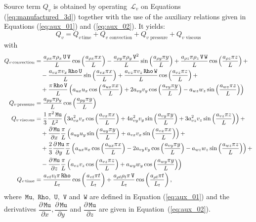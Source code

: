 \documentclass[10pt]{article}
\newcommand{\diff}[2] {\dfrac{\partial #1}{\partial #2}}
\newcommand{\Rho}{\,\mathtt{Rho}}
\newcommand{\U}{\,\mathtt{U}}
\newcommand{\V}{\,\mathtt{V}}
\newcommand{\W}{\,\mathtt{W}}
\newcommand{\Lo}{\,\mathcal{L}}
\newcommand{\Mu}{\,\mathtt{Mu}}
\newcommand{\DMuDx}{\diff{\Mu}{x}}
\newcommand{\DMuDy}{\diff{\Mu}{y}}
\newcommand{\DMuDz}{\diff{\Mu}{z}}
\newcommand{\timee}{\,\text{time}}
\newcommand{\convection}{\,\text{convection}}
\newcommand{\viscous}{\,\text{viscous}}
\newcommand{\pressure}{\,\text{pressure}}
\begin{document}
Source term $Q_v$ is obtained by operating $\Lo_{v}$ on Equations  (\ref{eq:manufactured_3d}) together with the use of the  auxiliary relations given in Equations (\ref{eq:aux_01}) and (\ref{eq:aux_02}). It yields:
\begin{equation*}
 Q_v = Q_{v \, \text{time}}+Q_{v \, \convection}+Q_{v \, \pressure }+Q_{v \, \viscous }
\end{equation*}
with
\begin{equation*}
\begin{split}
 Q_{v \convection} &= \dfrac{a_{\rho x} \pi \rho_x \U \V }{L}\cos\left(\dfrac{a_{\rho x} \pi x}{L}\right)
-\dfrac{a_{\rho y} \pi \rho_y \V^2 }{L}\sin\left(\dfrac{a_{\rho y} \pi y}{L}\right) 
+\dfrac{a_{\rho z} \pi \rho_z \V \W }{L}\cos\left(\dfrac{a_{\rho z} \pi z}{L}\right) + \\ 
  &\quad-\dfrac{a_{vx} \pi v_x \Rho \U }{L}\sin\left(\dfrac{a_{vx} \pi x}{L}\right)
  +\dfrac{a_{vz} \pi v_z \Rho \W }{L}\cos\left(\dfrac{a_{vz} \pi z}{L}\right) + \\ 
  &\quad+  \dfrac{\pi \Rho \V}{L} \left(a_{ux} u_x \cos\left(\dfrac{a_{ux} \pi x}{L}\right)+2 a_{vy} v_y \cos\left(\dfrac{a_{vy} \pi y}{L}\right)-a_{wz} w_z \sin\left(\dfrac{a_{wz} \pi z}{L}\right)\right) \\ \vspace{15pt}
%
Q_{v \pressure} &= \dfrac{a_{py} \pi p_y }{L}\cos\left(\dfrac{a_{py} \pi y}{L}\right) \\ \vspace{15pt}
%
Q_{v \viscous} &= \dfrac{1}{3} \dfrac{\pi^2 \Mu}{L^2}\left(3 a_{vx}^2 v_x \cos\left(\dfrac{a_{vx} \pi x}{L}\right)+4 a_{vy}^2 v_y \sin\left(\dfrac{a_{vy} \pi y}{L}\right)+3 a_{vz}^2 v_z \sin\left(\dfrac{a_{vz} \pi z}{L}\right)\right) + \\ 
&\quad+ \DMuDx \dfrac{\pi}{L} \left(a_{uy} u_y \sin\left(\dfrac{a_{uy} \pi y}{L}\right)+a_{vx} v_x \sin\left(\dfrac{a_{vx} \pi x}{L}\right)\right) + \\ 
&\quad+\dfrac{2}{3} \DMuDy \dfrac{\pi}{L}\left(a_{ux} u_x \cos\left(\dfrac{a_{ux} \pi x}{L}\right)-2 a_{vy} v_y \cos\left(\dfrac{a_{vy} \pi y}{L}\right)-a_{wz} w_z \sin\left(\dfrac{a_{wz} \pi z}{L}\right)\right)  + \\ 
&\quad-\DMuDz \dfrac{\pi}{L} \left(a_{vz} v_z \cos\left(\dfrac{a_{vz} \pi z}{L}\right)+a_{wy} w_y \cos\left(\dfrac{a_{wy} \pi y}{L}\right)\right)  \\ \vspace{15pt}
%
Q_{v \timee} &= \dfrac{a_{vt} v_t \pi \Rho }{L_t}\cos\left(\dfrac{a_{vt} \pi t}{L_t}\right)  +\dfrac{a_{\rho t} \rho_t \pi \V }{L_t}\cos\left(\dfrac{a_{\rho t} \pi t}{L_t}\right),
\end{split}
\end{equation*}
where $\Mu,\, \Rho,\,\U,\,\V$ and $\W$  are defined in Equation (\ref{eq:aux_01}) and the derivatives $\DMuDx,\DMuDy$ and $\DMuDz$ are given in Equation~(\ref{eq:aux_02}).
\end{document}

